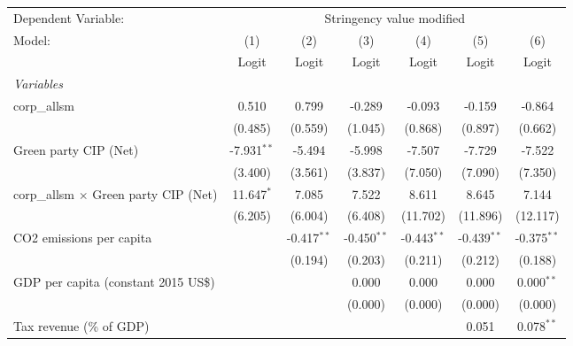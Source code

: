 
\begingroup
\centering
\begin{tabular}{lcccccc}
   \toprule
   Dependent Variable: & \multicolumn{6}{c}{Stringency value modified}\\
   Model:                                       & (1)           & (2)           & (3)           & (4)           & (5)           & (6)\\  
                                                &  Logit        & Logit         & Logit         & Logit         & Logit         & Logit\\  
   \midrule
   \emph{Variables}\\
   corp\_allsm                                  & 0.510         & 0.799         & -0.289        & -0.093        & -0.159        & -0.864\\   
                                                & (0.485)       & (0.559)       & (1.045)       & (0.868)       & (0.897)       & (0.662)\\   
   Green party CIP (Net)                        & -7.931$^{**}$ & -5.494        & -5.998        & -7.507        & -7.729        & -7.522\\   
                                                & (3.400)       & (3.561)       & (3.837)       & (7.050)       & (7.090)       & (7.350)\\   
   corp\_allsm $\times$ Green party CIP (Net)   & 11.647$^{*}$  & 7.085         & 7.522         & 8.611         & 8.645         & 7.144\\   
                                                & (6.205)       & (6.004)       & (6.408)       & (11.702)      & (11.896)      & (12.117)\\   
   CO2 emissions per capita                     &               & -0.417$^{**}$ & -0.450$^{**}$ & -0.443$^{**}$ & -0.439$^{**}$ & -0.375$^{**}$\\   
                                                &               & (0.194)       & (0.203)       & (0.211)       & (0.212)       & (0.188)\\   
   GDP per capita (constant 2015 US\$)          &               &               & 0.000         & 0.000         & 0.000         & 0.000$^{**}$\\   
                                                &               &               & (0.000)       & (0.000)       & (0.000)       & (0.000)\\   
   Tax revenue (\% of GDP)                      &               &               &               &               & 0.051         & 0.078$^{**}$\\   

\end{tabular}
